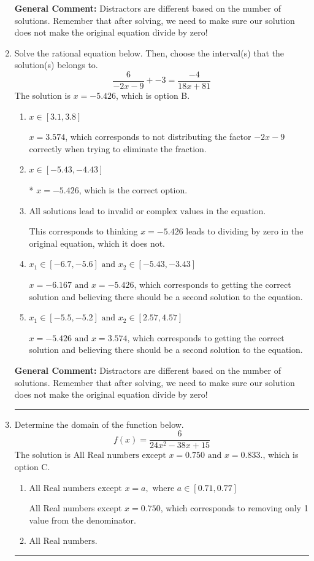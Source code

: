 \documentclass{extbook}[14pt]
\newcommand{\litem}[1]{\item #1

\rule{\textwidth}{0.4pt}}
\begin{document}
\begin{enumerate}
{\textbf{General Comment:} Distractors are different based on the number of solutions. Remember that after solving, we need to make sure our solution does not make the original equation divide by zero!
}
\litem{
Solve the rational equation below. Then, choose the interval(s) that the solution(s) belongs to.
\[ \frac{6}{-2x -9} + -3 = \frac{-4}{18x + 81} \]The solution is \( x = -5.426 \), which is option B.\begin{enumerate}[label=\Alph*.]
\item \( x \in [3.1,3.8] \)

$x = 3.574$, which corresponds to not distributing the factor $-2x -9$ correctly when trying to eliminate the fraction.
\item \( x \in [-5.43,-4.43] \)

* $x = -5.426$, which is the correct option.
\item \( \text{All solutions lead to invalid or complex values in the equation.} \)

This corresponds to thinking $x = -5.426$ leads to dividing by zero in the original equation, which it does not.
\item \( x_1 \in [-6.7, -5.6] \text{ and } x_2 \in [-5.43,-3.43] \)

$x = -6.167 \text{ and } x = -5.426$, which corresponds to getting the correct solution and believing there should be a second solution to the equation.
\item \( x_1 \in [-5.5, -5.2] \text{ and } x_2 \in [2.57,4.57] \)

$x = -5.426 \text{ and } x = 3.574$, which corresponds to getting the correct solution and believing there should be a second solution to the equation.
\end{enumerate}

\textbf{General Comment:} Distractors are different based on the number of solutions. Remember that after solving, we need to make sure our solution does not make the original equation divide by zero!
}
\litem{
Determine the domain of the function below.
\[ f(x) = \frac{6}{24x^{2} -38 x + 15} \]The solution is \( \text{All Real numbers except } x = 0.750 \text{ and } x = 0.833. \), which is option C.\begin{enumerate}[label=\Alph*.]
\item \( \text{All Real numbers except } x = a, \text{ where } a \in [0.71, 0.77] \)

All Real numbers except $x = 0.750$, which corresponds to removing only 1 value from the denominator.
\item \( \text{All Real numbers.} \)


\end{enumerate}}
\end{enumerate}
\end{document}
